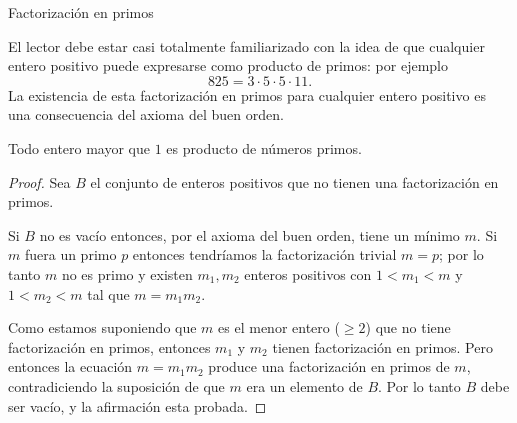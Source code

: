 \begin{section}{Factorización en primos}


El lector debe estar casi totalmente familiarizado con la idea de que cualquier entero positivo puede
expresarse como producto de primos: por ejemplo
$$
825=3\cdot 5\cdot 5\cdot 11.
$$
La existencia de esta factorización en primos para cualquier entero positivo es una consecuencia del axioma del buen orden.

\begin{teorema}
Todo  entero  mayor que $1$ es producto de números primos. 
\end{teorema}                                                
\begin{proof} Sea $B$ el conjunto de enteros positivos que no tienen una factorización en primos.

Si $B$ no es vacío entonces, por el axioma del buen orden, tiene un mínimo $m$. Si $m$ fuera un primo $p$ entonces tendríamos la factorización trivial $m=p$; por lo tanto $m$ no es primo y existen $m_1,m_2$ enteros positivos con  $1<m_1<m$ y $1<m_2< m$ tal que $m=m_1m_2$.

Como estamos suponiendo que $m$ es el menor entero ($\ge 2$) que no tiene factorización en primos, entonces $m_1$ y $m_2$ tienen factorización en primos. Pero entonces la ecuación $m=m_1m_2$ produce una factorización en primos de $m$, contradiciendo la suposición de que $m$ era un elemento de $B$. Por lo tanto $B$ debe ser vacío, y la afirmación esta probada.
\end{proof}


\end{section}
